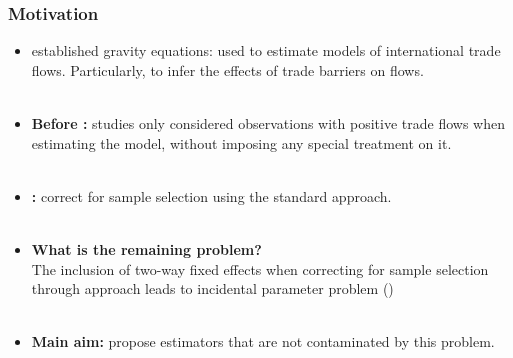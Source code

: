 \begin{frame}
    \frametitle{Motivation}
    \begin{itemize}
        \item    \cite{tinbergen1962shaping} established gravity equations: used to estimate models of international trade flows. Particularly, to infer the effects of trade barriers on flows.\\~\\  \pause
        \item \textbf{Before \cite{helpman2008estimating}:} studies only considered observations with positive trade flows when estimating the model, without imposing any special treatment on it. \\~\\ 
        \item \textbf{\cite{helpman2008estimating}:} correct for sample selection using the standard \cite{heckman1979sample} approach. \hyperlink{Gravity model}{}\\~\\ \pause
        \item \textbf{What is the remaining problem?} \\
        The inclusion of two-way fixed effects when correcting for sample selection through \cite{heckman1979sample} approach leads to incidental parameter problem (\cite{neyman1948consistent})\\~\\  \pause
        \item \textbf{Main aim:} propose estimators that are not contaminated by this problem.
    \end{itemize}


  \end{frame}

